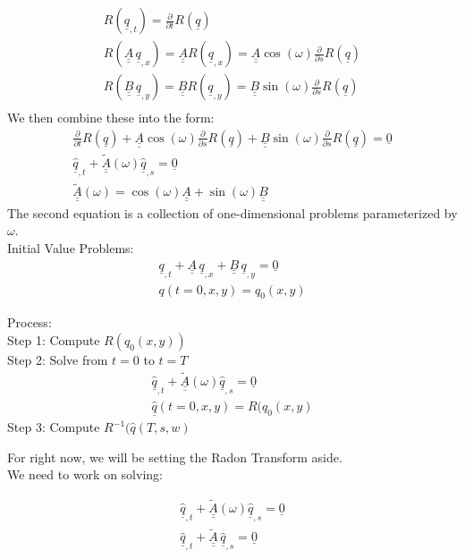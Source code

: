 \documentclass[12pt]{article}
\newcommand{\bunderline}[1]{\underline{#1}}
\renewcommand{\vec}[1]{{\bunderline{#1}}}
\newcommand{\mat}[1]{{\bunderline{\bunderline{#1}}}}
\begin{document}
\begin{align*}
R(\vec{q}_{,t}) = \frac{\partial}{\partial t} R(\vec{q}) \\
R(\mat{A}\,\vec{q}_{,x}) = \mat{A}R(\vec{q}_{,x}) = \mat{A}\cos(\omega)\frac{\partial}{\partial s}R(\vec{q}) \\
R(\mat{B}\,\vec{q}_{,y}) = \mat{B}R(\vec{q}_{,y}) = \mat{B}\sin(\omega)\frac{\partial}{\partial s}R(\vec{q}) \\
\end{align*}
We then combine these into the form:
\begin{align*}
\frac{\partial}{\partial t} R(\vec{q}) + \mat{A}\cos(\omega)\frac{\partial}{\partial s}R(\vec{q}) + \mat{B}\sin(\omega)\frac{\partial}{\partial s}R(\vec{q}) = \vec{0} \\
\widehat{\vec{q}}_{,t} + \widetilde{\mat{A}}(\omega)\widehat{\vec{q}}_{,s} = \vec{0} \\
\widetilde{\mat{A}}(\omega) = \cos(\omega)\mat{A} + \sin(\omega)\mat{B}
\end{align*}
The second equation is a collection of one-dimensional problems parameterized by $\omega$. \\

Initial Value Problems:
\begin{align*}
\vec{q}_{,t} + \mat{A}\,\vec{q}_{,x} + \mat{B}\,\vec{q}_{,y} = \vec{0} \\
q(t=0,x,y) = q_0(x,y)
\end{align*}

Process: \\
Step 1: Compute $R(q_0(x,y))$ \\
Step 2: Solve from $t=0$ to $t=T$
\begin{align*}
\widehat{\vec{q}}_{,t} + \widetilde{\mat{A}}(\omega)\widehat{\vec{q}}_{,s} = \vec{0} \\
\widehat{\vec{q}}(t=0,x,y) = R(q_0(x,y)
\end{align*}
Step 3: Compute $R^{-1}(\widehat{q}(T,s,w)$

For right now, we will be setting the Radon Transform aside. \\

We need to work on solving:

\begin{align*}
\widehat{\vec{q}}_{,t} + \widetilde{\mat{A}}(\omega) \widehat{\vec{q}}_{,s} = \vec{0} \\
\widehat{\vec{q}}_{,t} + \widetilde{\mat{A}}\,\widehat{\vec{q}}_{,s} = \vec{0}
\end{align*}
\end{document}
